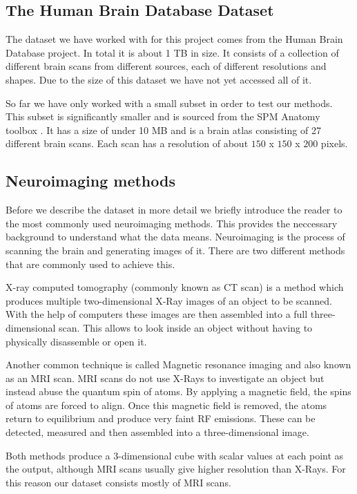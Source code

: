 \label{sec:dataset}

\subsection{The Human Brain Database Dataset}

The dataset we have worked with for this project comes from the Human Brain Database project. In total it is about 1 TB in size. It consists of a collection of different brain scans from different sources, each of different resolutions and shapes. Due to the size of this dataset we have not yet accessed all of it. 

So far we have only worked with a small subset in order to test our methods. This subset is significantly smaller and is sourced from the SPM Anatomy toolbox \cite{SPMAnatomyToolbox:website}. It has a size of under 10 MB and is a brain atlas consisting of 27 different brain scans. Each scan has a resolution of about $150$ x $150$ x $200$ pixels. 

\subsection{Neuroimaging methods}

Before we describe the dataset in more detail we briefly introduce the reader to the most commonly used neuroimaging methods. This provides the neccessary background to understand what the data means. Neuroimaging is the process of scanning the brain and generating images of it. There are two different methods that are commonly used to achieve this. 

X-ray computed tomography (commonly known as CT scan) is a method which produces multiple two-dimensional X-Ray images of an object to be scanned. With the help of computers these images are then assembled into a full three-dimensional scan. This allows to look inside an object without having to physically disassemble or open it. 

Another common technique is called Magnetic resonance imaging and also known as an MRI scan. MRI scans do not use X-Rays to investigate an object but instead abuse the quantum spin of atoms. By applying a magnetic field, the spins of atoms are forced to align. Once this magnetic field is removed, the atoms return to equilibrium and produce very faint RF emissions. These can be detected, measured and then assembled into a three-dimensional image. 

Both methods produce a 3-dimensional cube with scalar values at each point as the output, although MRI scans usually give higher resolution than X-Rays. For this reason our dataset consists mostly of MRI scans. 

